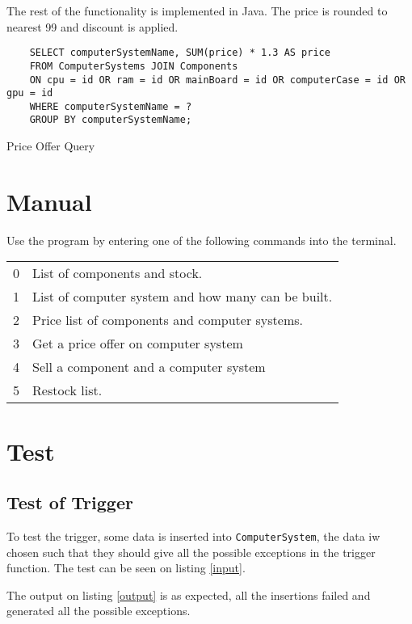 \documentclass[12pt,a4paper]{article}
\begin{document}
The rest of the functionality is implemented in Java. The price is rounded to nearest 99 and discount is applied.

\begin{listing}[!htbp]
    \begin{verbatim}
    SELECT computerSystemName, SUM(price) * 1.3 AS price
    FROM ComputerSystems JOIN Components
    ON cpu = id OR ram = id OR mainBoard = id OR computerCase = id OR gpu = id
    WHERE computerSystemName = ?
    GROUP BY computerSystemName;
    \end{verbatim}
    \caption{Price Offer Query}
    \label{lst:offer}
    \end{listing}
\section{Manual}
Use the program by entering one of the following commands into the terminal.

{\ttfamily
\begin{center}
\begin{tabular}{ll}
    0 & List of components and stock. \\ 
    1 & List of computer system and how many can be built. \\ 
    2 & Price list of components and computer systems. \\ 
    3 & Get a price offer on computer system \\
    4 & Sell a component and a computer system \\
    5 & Restock list. \\ 
\end{tabular}
\end{center}}

\section{Test}
\subsection{Test of Trigger}
To test the trigger, some data is inserted into \texttt{ComputerSystem}, the data iw chosen such that they should give all the possible exceptions in the trigger function. The test can be seen on listing \ref{input}.

The output on listing \ref{output} is as expected, all the insertions failed and generated all the possible exceptions.
\end{document}
